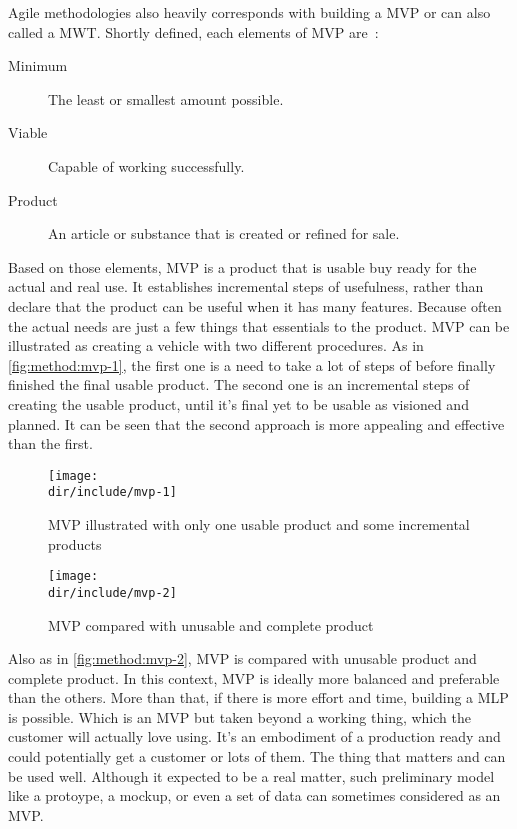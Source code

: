 Agile methodologies also heavily corresponds with building a \ac{MVP} or can also called a \ac{MWT}.
Shortly defined, each elements of \ac{MVP} are~\autocite{Montgomery2013MWT}:

\begin{description}
  \item[Minimum] The least or smallest amount possible.
  \item[Viable] Capable of working successfully.
  \item[Product] An article or substance that is created or refined for sale.
\end{description}

Based on those elements, \ac{MVP} is a product that is usable buy ready for the actual and real use.
It establishes incremental steps of usefulness, rather than declare that the product can be useful when it has many features.
Because often the actual needs are just a few things that essentials to the product.
\ac{MVP} can be illustrated as creating a vehicle with two different procedures.
As in \autoref{fig:method:mvp-1}, the first one is a need to take a lot of steps of before finally finished the final usable product.
The second one is an incremental steps of creating the usable product, until it's final yet to be usable as visioned and planned.
It can be seen that the second approach is more appealing and effective than the first.

\begin{figure}[!ht]
    \centering
    \texttt{[image: \\dir/include/mvp-1]}
    \caption[MVP illustrated]{MVP illustrated with only one usable product and some incremental products~\autocite{Mercury2014MVP}}
    \label{fig:method:mvp-1}
\end{figure}

\begin{figure}[!ht]
    \centering
    \texttt{[image: \\dir/include/mvp-2]}
    \caption[MVP compared]{MVP compared with unusable and complete product~\autocite{Mercury2014MVP}}
    \label{fig:method:mvp-2}
\end{figure}

Also as in \autoref{fig:method:mvp-2}, \ac{MVP} is compared with unusable product and complete product.
In this context, \ac{MVP} is ideally more balanced and preferable than the others.
More than that, if there is more effort and time, building a \ac{MLP} is possible.
Which is an \ac{MVP} but taken beyond a working thing, which the customer will actually love using.
It's an embodiment of a production ready and could potentially get a customer or lots of them.
The thing that matters and can be used well.
Although it expected to be a real matter, such preliminary model like a protoype, a mockup, or even a set of data can sometimes considered as an \ac{MVP}.
